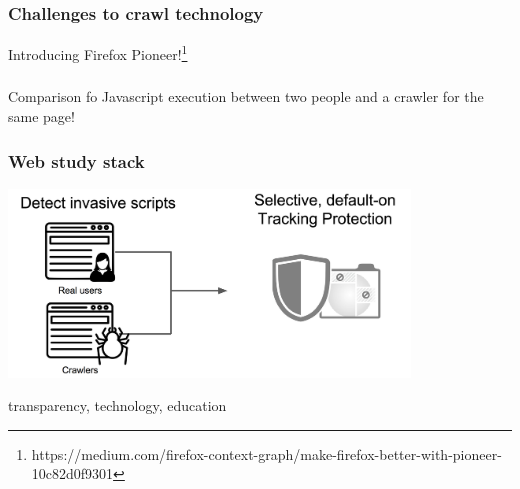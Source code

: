 \documentclass[aspectratio=169]{beamer}
\newcommand\blfootnote[1]{%
  \begingroup
  \renewcommand\thefootnote{}\footnote{#1}%
  \addtocounter{footnote}{-1}%
  \endgroup
}
\begin{document}
\begin{frame}
\frametitle{Challenges to crawl technology}

Introducing Firefox Pioneer!\footnote{https://medium.com/firefox-context-graph/make-firefox-better-with-pioneer-10c82d0f9301}
\end{frame}

\begin{frame}
\frametitle{}
Comparison fo Javascript execution between two people and a crawler for the same page!
\end{frame}

\begin{frame}
\frametitle{Web study stack}
\includegraphics[width=0.8\textwidth]{steve_slide.png}
\end{frame}

\begin{frame}
transparency, technology, education


\end{frame}
\end{document}
